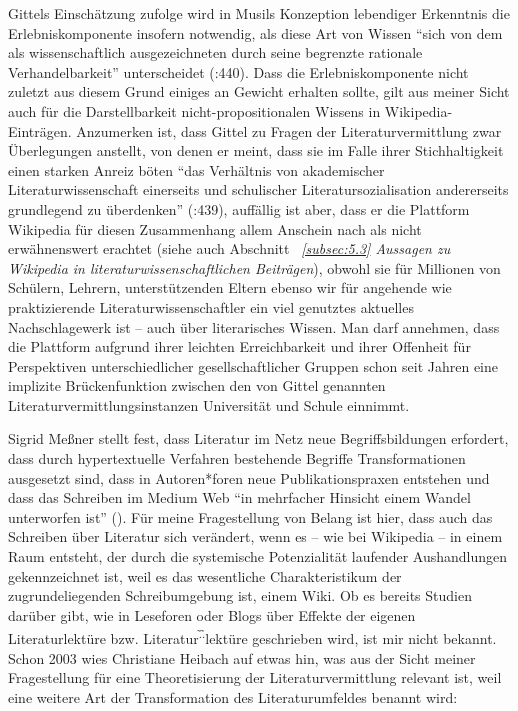 \documentclass[fontsize=12pt]{scrartcl}
\begin{document}
Gittels Einsch\"atzung zufolge wird in Musils Konzeption lebendiger Erkenntnis die Erlebniskomponente insofern notwendig, als diese Art von Wissen "`sich von dem als wissenschaftlich ausge\-zeichneten durch seine begrenzte rationale Verhandelbarkeit"' unterscheidet (\cite{Gittel2013}:440). Dass die Erlebniskomponente nicht zu\-letzt aus diesem Grund einiges an Gewicht erhalten sollte, gilt aus meiner Sicht auch f\"ur die Darstellbarkeit nicht-pro\-po\-si\-ti\-o\-na\-len Wissens in Wi\-ki\-pe\-dia-Eintr\"agen. Anzumerken ist, dass Gittel zu Fragen der Li\-te\-ra\-tur\-ver\-mitt\-lung zwar \"Uberlegungen anstellt, von denen er meint, dass sie im Falle ihrer Stichhaltigkeit einen starken Anreiz b\"oten "`das Verh\"altnis von akademischer Li\-te\-ra\-tur\-wissenschaft einerseits und schulischer Li\-te\-ra\-tur\-sozialisation an\-de\-rerseits grundlegend zu \"uberdenken"' (\cite{Gittel2013}:439), auff\"allig ist aber, dass er die Plattform Wi\-ki\-pe\-dia f\"ur diesen Zusammenhang allem Anschein nach als nicht erw\"ahnenswert erachtet (siehe auch Abschnitt \textit{~\ref{subsec:5.3} Aussagen zu Wi\-ki\-pe\-dia in li\-te\-ra\-tur\-wissenschaftlichen Beitr\"agen}), obwohl sie f\"ur Millionen von Sch\"ulern\textsuperscript{\tiny *}, Lehrern\textsuperscript{\tiny *}, unterst\"utzenden Eltern\textsuperscript{\tiny *} ebenso wir f\"ur angehende wie praktizierende Li\-te\-ra\-tur\-wissenschaftler\textsuperscript{\tiny *} ein viel ge\-nutz\-tes aktuelles Nachschlagewerk ist -- auch \"uber li\-te\-ra\-risches Wissen. Man darf annehmen, dass die Plattform aufgrund ihrer leichten Erreichbarkeit und ihrer Offenheit f\"ur Perspektiven unterschiedlicher ge\-sell\-schaftlicher Gruppen schon seit Jahren eine implizite Br\"uckenfunktion zwischen den von Gittel genannten Li\-te\-ra\-tur\-ver\-mitt\-lungs\-instan\-zen Universit\"at und Schule einnimmt.

Sigrid Me{\ss}ner stellt fest, dass Li\-te\-ra\-tur im Netz neue Begriffsbildungen erfordert, dass durch hypertextuelle Verfahren bestehende Begriffe Transformationen ausgesetzt sind, dass in Autoren*foren neue Publikationspraxen entstehen und dass das Schrei\-ben im Medium Web "`in mehrfacher Hinsicht einem Wandel unterworfen ist"' (\cite{Messner2012}). F\"ur meine Fragestellung von Belang ist \mbox{hier}, dass auch das Schrei\-ben \"uber Li\-te\-ra\-tur sich ver\"andert, wenn es -- wie bei Wi\-ki\-pe\-dia -- in einem Raum entsteht, der durch die systemische Potenzialit\"at laufender Aushandlungen gekennzeichnet ist, weil es das we\-sent\-liche Charakteristikum der zugrundeliegenden Schreibumgebung ist, einem Wiki. Ob es bereits Studien dar\"uber gibt, wie in Leseforen oder Blogs \"uber Effekte der eigenen Li\-te\-ra\-tur\-lekt\"ure bzw. Li\-te\-ra\-tur\textsuperscript{\~.\~.}lekt\"ure geschrieben wird, ist mir nicht bekannt. Schon 2003 wies Christiane Heibach auf etwas hin, was aus der Sicht mei\-ner Fragestellung f\"ur eine Theo\-retisierung der Li\-te\-ra\-tur\-ver\-mitt\-lung relevant ist, weil eine weitere Art der Transformation des Li\-te\-ra\-tur\-umfeldes benannt wird:
\end{document}
